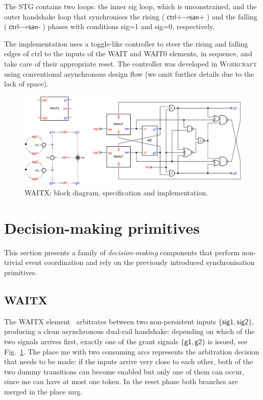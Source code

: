 \documentclass[conference]{IEEEtran}
\begin{document}
The STG contains two loops: the inner \textsf{sig} loop, which is unconstrained, and
the outer handshake loop that synchronises the rising
($\textsf{ctrl+} \longrightarrow \textsf{san+}$)
 and the falling
($\textsf{ctrl-} \longrightarrow \textsf{san-}$)
phases with conditions \textsf{sig=1} and \textsf{sig=0}, respectively.

The implementation uses a toggle-like controller to steer the
rising and falling edges of \textsf{ctrl} to the inputs of the \textsf{WAIT} and
\textsf{WAIT0} elements, in sequence, and take care of their appropriate
reset. The controller was developed in \textsc{Workcraft}~\cite{Workcraft_website}
using conventional asynchronous design flow (we omit further
details due to the lack of space).

\begin{figure}
\begin{center}
    \includegraphics[scale=0.23]{fig/WAITX.pdf}
    \vspace{-3mm}
    \caption{\textsf{WAITX}: block diagram, specification and implementation.}
    \label{fig:waitx}
    \vspace{-7mm}
\end{center}
\end{figure}

\section{Decision-making primitives}\label{sec-decision}

This section presents a family of \emph{decision-making} components that perform
non-trivial event coordination and rely on the previously introduced synchronisation
primitives.

\subsection*{\textsf{WAITX}}

The \textsf{WAITX} element~\cite{2017_khomenko_waitx} arbitrates between two
non-persistent inputs $\{\textsf{sig1}, \textsf{sig2}\}$, producing a clean
asynchronous dual-rail handshake: depending on which of the two signals arrives
first, exactly one of the grant signals $\{\textsf{g1}, \textsf{g2}\}$ is issued, see
Fig.~\ref{fig:waitx}. The place \textsf{me} with two consuming arcs represents
the arbitration decision that needs to be made: if the inputs arrive very close to
each other, both of the two dummy transitions can become enabled but only one
of them can occur, since \textsf{me} can have at most one token. In the reset phase
both branches are merged in the place \textsf{mrg}.
\end{document}
